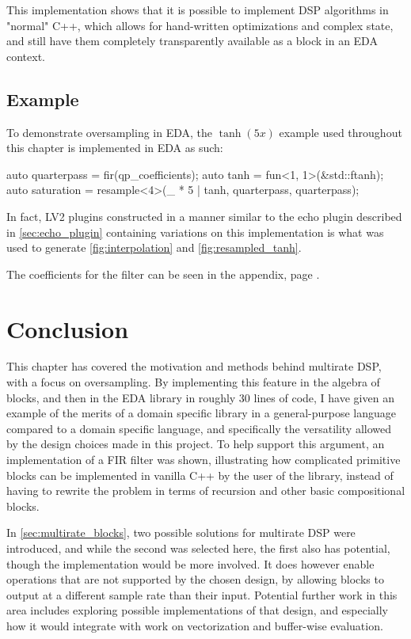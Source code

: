 This implementation shows that it is possible to implement DSP algorithms in "normal" C++, which allows for
hand-written optimizations and complex state, and still have them completely transparently available as a
block in an EDA context.

\subsection{Example}

To demonstrate oversampling in EDA, the $\tanh(5x)$ example used throughout this chapter is
implemented in EDA as such:

\begin{cppcodenl}
  auto quarterpass = fir(qp_coefficients);
  auto tanh = fun<1, 1>(&std::ftanh);
  auto saturation = resample<4>(_ * 5 | tanh, quarterpass, quarterpass);
\end{cppcodenl}

In fact, LV2 plugins constructed in a manner similar to the echo plugin described in \autoref{sec:echo_plugin}
containing variations on this implementation is what was used to generate \autoref{fig:interpolation} and
\autoref{fig:resampled_tanh}.

The coefficients for the filter can be seen in the appendix, page \pageref{codefile:include/eda/resampling.hpp}.

\section{Conclusion}

This chapter has covered the motivation and methods behind multirate DSP, with a focus on oversampling. By
implementing this feature in the algebra of blocks, and then in the EDA library in roughly 30 lines of code,
I have given an example of the merits of a domain specific library in a general-purpose language compared to
a domain specific language, and specifically the versatility allowed by the design choices made in this
project. To help support this argument, an implementation of a FIR filter was shown, illustrating how
complicated primitive blocks can be implemented in vanilla C++ by the user of the library, instead of having
to rewrite the problem in terms of recursion and other basic compositional blocks.

In \autoref{sec:multirate_blocks}, two possible solutions for multirate DSP were introduced, and while the second
was selected here, the first also has potential, though the implementation would be more involved. It does
however enable operations that are not supported by the chosen design, by allowing blocks to output at a
different sample rate than their input. Potential further work in this area includes exploring possible
implementations of that design, and especially how it would integrate with work on vectorization and
buffer-wise evaluation.
